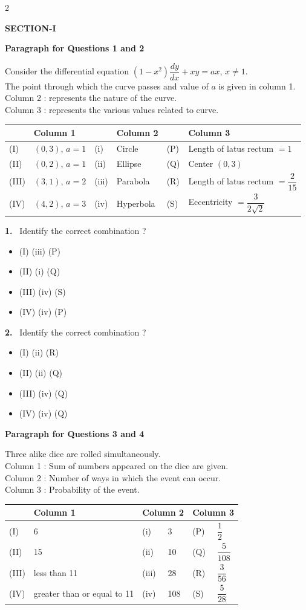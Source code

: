 \documentclass[10pt]{extarticle}
\newcommand{\partsec}[2]{\par\medskip\noindent{\large\bfseries PART-#1: #2}\par\smallskip}
\newcommand{\sect}[1]{\par\smallskip\noindent\textbf{#1}\par}
\newcommand{\qn}[1]{\par\smallskip\noindent\textbf{#1.}~}
\newcommand{\paraq}[2]{\par\smallskip\noindent\textbf{Paragraph for Questions #1 and #2}\par}
\newenvironment{qoptions}{\begin{itemize}[leftmargin=1.8em,itemsep=1pt,topsep=2pt,label={}]}{\end{itemize}}
\newcommand{\opt}[2]{\item[(#1)] #2}
\begin{document}
\begin{multicols}{2}
\partsec{3}{MATHEMATICS}
\sect{SECTION-I}
\paraq{1}{2}
Consider the differential equation $(1-x^2)\dfrac{dy}{dx}+xy=ax$, $x\ne1$.\\
The point through which the curve passes and value of $a$ is given in column 1.\\
Column 2 : represents the nature of the curve.\\
Column 3 : represents the various values related to curve.
\begin{center}\footnotesize
\begin{tabular}{|p{0.6cm}|p{1.6cm}|p{0.6cm}|p{1.4cm}|p{0.5cm}|p{2.2cm}|}
\hline
 & \centering Column 1 & & \centering Column 2 & & \centering Column 3\tabularnewline
\hline
(I) & $(0,3)$, $a=1$ & (i) & Circle & (P) & Length of latus rectum $=1$\\
(II) & $(0,2)$, $a=1$ & (ii) & Ellipse & (Q) & Center $(0,3)$\\
(III) & $(3,1)$, $a=2$ & (iii) & Parabola & (R) & Length of latus rectum $=\dfrac2{15}$\\
(IV) & $(4,2)$, $a=3$ & (iv) & Hyperbola & (S) & Eccentricity $=\dfrac3{2\sqrt2}$\\
\hline
\end{tabular}
\end{center}

\qn{1} Identify the correct combination ?
\begin{qoptions}
\opt{A}{(I) (iii) (P)}
\opt{B}{(II) (i) (Q)}
\opt{C}{(III) (iv) (S)}
\opt{D}{(IV) (iv) (P)}
\end{qoptions}

\qn{2} Identify the correct combination ?
\begin{qoptions}
\opt{A}{(I) (ii) (R)}
\opt{B}{(II) (ii) (Q)}
\opt{C}{(III) (iv) (Q)}
\opt{D}{(IV) (iv) (Q)}
\end{qoptions}

\paraq{3}{4}
Three alike dice are rolled simultaneously.\\
Column 1 : Sum of numbers appeared on the dice are given.\\
Column 2 : Number of ways in which the event can occur.\\
Column 3 : Probability of the event.
\begin{center}\footnotesize
\begin{tabular}{|p{0.6cm}|p{2.2cm}|p{0.6cm}|p{0.8cm}|p{0.5cm}|p{1.3cm}|}
\hline
 & \centering Column 1 & \multicolumn{2}{c|}{Column 2} & \multicolumn{2}{c|}{Column 3}\\
\hline
(I) & 6 & (i) & 3 & (P) & $\dfrac12$\\
(II) & 15 & (ii) & 10 & (Q) & $\dfrac5{108}$\\
(III) & less than 11 & (iii) & 28 & (R) & $\dfrac3{56}$\\
(IV) & greater than or equal to 11 & (iv) & 108 & (S) & $\dfrac5{28}$\\
\hline
\end{tabular}
\end{center}


\end{multicols}
\end{document}

